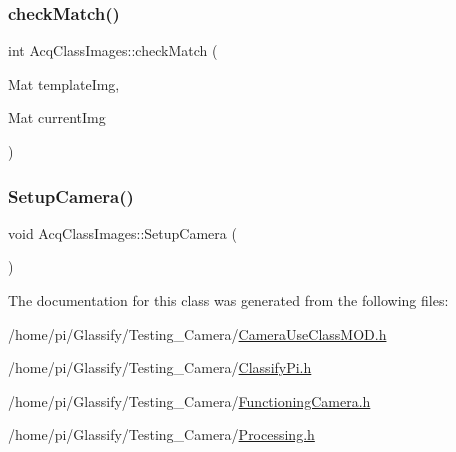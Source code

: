 \mbox{\label{classAcqClassImages_a70c3183e628a3f196e3e688bed0935f8}} 
\subsubsection{\texorpdfstring{check\+Match()}{checkMatch()}}
{\footnotesize\ttfamily int Acq\+Class\+Images\+::check\+Match (\begin{DoxyParamCaption}\item[{Mat}]{template\+Img,  }\item[{Mat}]{current\+Img }\end{DoxyParamCaption})\hspace{0.3cm}{\ttfamily [inline]}}

\mbox{\label{classAcqClassImages_a63b8cb9d0629de84d600277534731646}} 
\subsubsection{\texorpdfstring{Setup\+Camera()}{SetupCamera()}}
{\footnotesize\ttfamily void Acq\+Class\+Images\+::\+Setup\+Camera (\begin{DoxyParamCaption}{ }\end{DoxyParamCaption})\hspace{0.3cm}{\ttfamily [inline]}}



The documentation for this class was generated from the following files\+:\begin{DoxyCompactItemize}
\item 
/home/pi/\+Glassify/\+Testing\+\_\+\+Camera/\hyperlink{CameraUseClassMOD_8h}{Camera\+Use\+Class\+M\+O\+D.\+h}\item 
/home/pi/\+Glassify/\+Testing\+\_\+\+Camera/\hyperlink{ClassifyPi_8h}{Classify\+Pi.\+h}\item 
/home/pi/\+Glassify/\+Testing\+\_\+\+Camera/\hyperlink{FunctioningCamera_8h}{Functioning\+Camera.\+h}\item 
/home/pi/\+Glassify/\+Testing\+\_\+\+Camera/\hyperlink{Processing_8h}{Processing.\+h}\end{DoxyCompactItemize}
